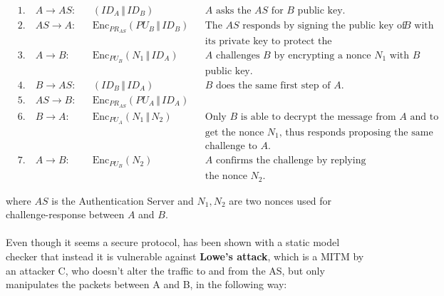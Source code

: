 \documentclass[oneside]{academica}
\begin{document}
\hspace{0.05\textwidth}
\begin{minipage}{0.95\textwidth}
  \vspace{-5pt}
  \begin{align*}
    & 1. \quad A \rightarrow AS: & & \left( ID_A \,\Vert\, ID_B \right) & & \text{$A$ asks the $AS$ for $B$ public key.} \\
    & 2. \quad AS \rightarrow A: & & \text{Enc}_{PR_{AS}} \left( PU_B \,\Vert\, ID_B \right) & & \text{The $AS$ responds by signing the public key of $B$ with} \\ & & & & & \text{its private key to protect the message from alteration.} \\
    & 3. \quad A \rightarrow B: & & \text{Enc}_{PU_B} \left( N_1 \,\Vert\, ID_A \right) & & \text{$A$ challenges $B$ by encrypting a nonce $N_1$ with $B$} \\ & & & & & \text{public key.} \\
    & 4. \quad B \rightarrow AS: & & \left( ID_B \,\Vert\, ID_A \right)  & & \text{$B$ does the same first step of $A$.} \\
    & 5. \quad AS \rightarrow B: & & \text{Enc}_{PR_{AS}} \left( PU_A \,\Vert\, ID_A \right) & & \\
    & 6. \quad B \rightarrow A: & & \text{Enc}_{PU_A} \left( N_1 \,\Vert\, N_2 \right) & & \text{Only $B$ is able to decrypt the message from $A$ and to} \\ & & & & & \text{get the nonce $N_1$, thus responds proposing the same} \\ & & & & & \text{challenge to $A$.} \\
    & 7. \quad A \rightarrow B: & & \text{Enc}_{PU_B} \left( N_2 \right) & & \text{$A$ confirms the challenge by replying with just} \\ & & & & & \text{the nonce $N_2$.}
  \end{align*}
\end{minipage}

\vspace{10pt}
where $AS$ is the Authentication Server and $N_1, N_2$ are two nonces used for challenge-response between $A$ and $B$.
\\\\
Even though it seems a secure protocol, has been shown with a static model checker that instead it is vulnerable against \textbf{Lowe's attack}, which is a MITM by an attacker C, who doesn't alter the traffic to and from the AS, but only manipulates the packets between A and B, in the following way:
\end{document}
